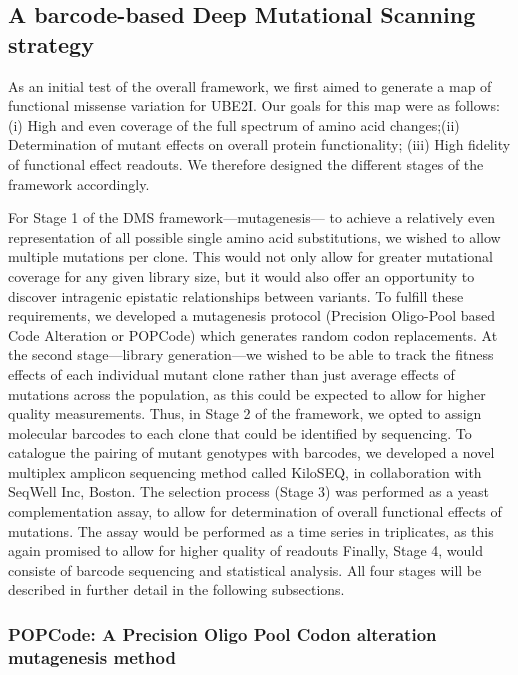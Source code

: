 \subsection{A barcode-based Deep Mutational Scanning strategy}


As an initial test of the overall framework, we first aimed to generate a map of functional missense variation for UBE2I. Our goals for this map were as follows: (i) High and even coverage of the full spectrum of amino acid changes;(ii) Determination of mutant effects on overall protein functionality; (iii) High fidelity of functional effect readouts. We therefore designed the different stages of the framework accordingly. 

For Stage 1 of the DMS framework---mutagenesis--- to achieve a relatively even representation of all possible single amino acid substitutions, we wished to allow multiple mutations per clone. This would not only allow for greater mutational coverage for any given library size, but it would also offer an opportunity to discover intragenic epistatic relationships between variants.  To fulfill these requirements, we developed a mutagenesis protocol (Precision Oligo-Pool based Code Alteration or POPCode) which generates random codon replacements. 
At the second stage---library generation---we wished to be able to track the fitness effects of each individual mutant clone rather than just average effects of mutations across the population, as this could be expected to allow for higher quality measurements. Thus, in Stage 2 of the framework, we opted to assign molecular barcodes to each clone that could be identified by sequencing. To catalogue the pairing of mutant genotypes with barcodes, we developed a novel multiplex amplicon sequencing method called KiloSEQ, in collaboration with SeqWell Inc, Boston. 
The selection process (Stage 3) was performed as a yeast complementation assay, to allow for determination of overall functional effects of mutations. The assay would be performed as a time series in triplicates, as this again promised to allow for higher quality of readouts 
Finally, Stage 4, would consiste of barcode sequencing and statistical analysis. All four stages will be described in further detail in the following subsections.


\subsubsection{POPCode: A Precision Oligo Pool Codon alteration mutagenesis method}

